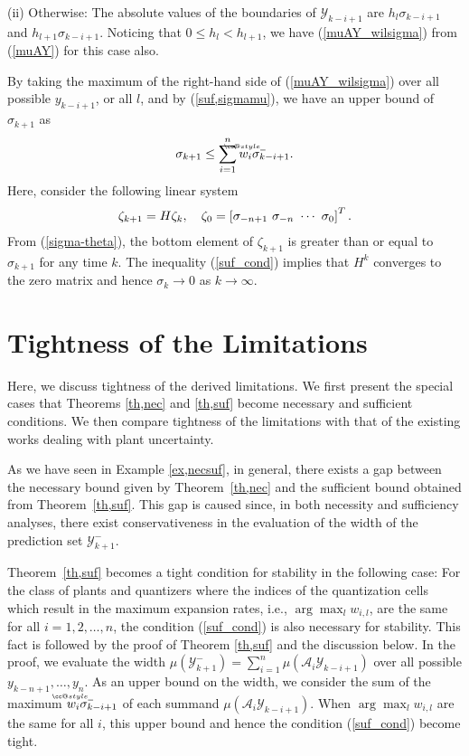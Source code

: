 \documentclass[a4paper, 11pt]{article}
\makeatletter
\def\widebar{\accentset{{\cc@style\underline{\mskip10mu}}}}
\newcommand{\calY}{\mathcal{Y}}
\newcommand{\calA}{\mathcal{A}}
\theoremstyle{definition}
\newenvironment{pf}[1][\proofname]{\par\pushQED{\qed}
 \normalfont\topsep6\p@\@plus6\p@\relax\trivlist\item[\hskip\labelsep\bfseries#1\@addpunct{.}]
 \ignorespaces}{\popQED\endtrivlist\@endpefalse}
\makeatother
\begin{document}
\begin{pf}[Proof of Theorem~\ref{th,suf}]
(ii) Otherwise:
The absolute values of the boundaries of $\calY_{k-i+1}$
are $h_{l}\sigma_{k-i+1}$ and $h_{l+1}\sigma_{k-i+1}$.
Noticing that $0\leq h_{l}<h_{l+1}$, we have (\ref{muAY_wilsigma})
from (\ref{muAY}) for this case also.


By taking the maximum of the right-hand side of (\ref{muAY_wilsigma}) over
all possible $y_{k-i+1}$, or all $l$,
and by (\ref{suf,sigmamu}), we have an upper bound of $\sigma_{k+1}$ as
\begin{align}
 \sigma_{k+1}\leq\sum^{n}_{i=1}\widebar w_{i}\sigma_{k-i+1}.\label{sigma-theta}
\end{align}
Here, consider the following linear system
\begin{align}
 \zeta_{k+1}=H\zeta_k,\quad
 \zeta_0=\left[\sigma_{-n+1}\ \sigma_{-n}\ \cdots\ \sigma_{0}\right]^T.
 \notag
\end{align}
From (\ref{sigma-theta}), the bottom element of $\zeta_{k+1}$ is greater
than or equal to $\sigma_{k+1}$ for any time $k$.
The inequality (\ref{suf_cond}) implies that $H^k$ converges to the zero
matrix and hence $\sigma_k\to0$ as $k\to\infty$.
\end{pf}


\section{Tightness of the Limitations}\label{sec,scalar}
Here, we discuss tightness of the derived limitations.
We first present the special cases that Theorems \ref{th,nec} and
\ref{th,suf} become necessary and sufficient conditions.
We then compare tightness of the limitations with that of the existing
works dealing with plant uncertainty.


As we have seen in Example \ref{ex,necsuf}, in general, there exists a gap between
the necessary bound given by Theorem~\ref{th,nec} and the
sufficient bound obtained from Theorem~\ref{th,suf}.
This gap is caused since, in both necessity and sufficiency analyses,
there exist conservativeness in the evaluation of the width of the prediction
set $\calY^-_{k+1}$.

Theorem~\ref{th,suf} becomes a tight condition for stability in the following
case:
For the class of plants and quantizers where the indices of the quantization
cells which result in the maximum expansion rates, i.e., $\arg\max_l w_{i,l}$,
are the same for all $i=1,2,\dots,n$, the condition (\ref{suf_cond}) is
also necessary for stability.
This fact is followed by the proof of Theorem \ref{th,suf} and
the discussion below.
In the proof, we evaluate the width $\mu(\calY^-_{k+1})=\sum_{i=1}^n\mu(\calA_i\calY_{k-i+1})$
over all possible $y_{k-n+1},\dots,y_n$.
As an upper bound on the width, we consider the sum of the
maximum $\widebar w_{i}\sigma_{k-i+1}$ of each summand $\mu(\calA_i\calY_{k-i+1})$.
When $\arg\max_l w_{i,l}$ are the same for all $i$, this upper bound
and hence the condition (\ref{suf_cond}) become tight.
\end{document}

